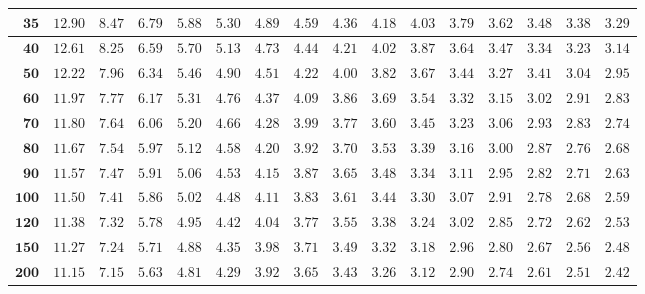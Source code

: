 \begin{alternateColorTable}
\begin{longtable}{|r|r|r|r|r|r|r|r|r|r|r|r|r|r|r|r|}
    \(\mathbf{35}\) & \(12.90\) & \(8.47\) & \(6.79\) & \(5.88\) & \(5.30\) & \(4.89\) & \(4.59\) & \(4.36\) & \(4.18\) & \(4.03\) & \(3.79\) & \(3.62\) & \(3.48\) & \(3.38\) & \(3.29\) \\ \hline 
    \(\mathbf{40}\) & \(12.61\) & \(8.25\) & \(6.59\) & \(5.70\) & \(5.13\) & \(4.73\) & \(4.44\) & \(4.21\) & \(4.02\) & \(3.87\) & \(3.64\) & \(3.47\) & \(3.34\) & \(3.23\) & \(3.14\) \\ \hline 
    \(\mathbf{50}\) & \(12.22\) & \(7.96\) & \(6.34\) & \(5.46\) & \(4.90\) & \(4.51\) & \(4.22\) & \(4.00\) & \(3.82\) & \(3.67\) & \(3.44\) & \(3.27\) & \(3.41\) & \(3.04\) & \(2.95\) \\ \hline 
    \(\mathbf{60}\) & \(11.97\) & \(7.77\) & \(6.17\) & \(5.31\) & \(4.76\) & \(4.37\) & \(4.09\) & \(3.86\) & \(3.69\) & \(3.54\) & \(3.32\) & \(3.15\) & \(3.02\) & \(2.91\) & \(2.83\) \\ \hline 
    \(\mathbf{70}\) & \(11.80\) & \(7.64\) & \(6.06\) & \(5.20\) & \(4.66\) & \(4.28\) & \(3.99\) & \(3.77\) & \(3.60\) & \(3.45\) & \(3.23\) & \(3.06\) & \(2.93\) & \(2.83\) & \(2.74\) \\ \hline 
    \(\mathbf{80}\) & \(11.67\) & \(7.54\) & \(5.97\) & \(5.12\) & \(4.58\) & \(4.20\) & \(3.92\) & \(3.70\) & \(3.53\) & \(3.39\) & \(3.16\) & \(3.00\) & \(2.87\) & \(2.76\) & \(2.68\) \\ \hline 
    \(\mathbf{90}\) & \(11.57\) & \(7.47\) & \(5.91\) & \(5.06\) & \(4.53\) & \(4.15\) & \(3.87\) & \(3.65\) & \(3.48\) & \(3.34\) & \(3.11\) & \(2.95\) & \(2.82\) & \(2.71\) & \(2.63\) \\ \hline 
    \(\mathbf{100}\) & \(11.50\) & \(7.41\) & \(5.86\) & \(5.02\) & \(4.48\) & \(4.11\) & \(3.83\) & \(3.61\) & \(3.44\) & \(3.30\) & \(3.07\) & \(2.91\) & \(2.78\) & \(2.68\) & \(2.59\) \\ \hline 
    \(\mathbf{120}\) & \(11.38\) & \(7.32\) & \(5.78\) & \(4.95\) & \(4.42\) & \(4.04\) & \(3.77\) & \(3.55\) & \(3.38\) & \(3.24\) & \(3.02\) & \(2.85\) & \(2.72\) & \(2.62\) & \(2.53\) \\ \hline 
    \(\mathbf{150}\) & \(11.27\) & \(7.24\) & \(5.71\) & \(4.88\) & \(4.35\) & \(3.98\) & \(3.71\) & \(3.49\) & \(3.32\) & \(3.18\) & \(2.96\) & \(2.80\) & \(2.67\) & \(2.56\) & \(2.48\) \\ \hline 
    \(\mathbf{200}\) & \(11.15\) & \(7.15\) & \(5.63\) & \(4.81\) & \(4.29\) & \(3.92\) & \(3.65\) & \(3.43\) & \(3.26\) & \(3.12\) & \(2.90\) & \(2.74\) & \(2.61\) & \(2.51\) & \(2.42\) \\ \hline 

\end{longtable}
\end{alternateColorTable}
